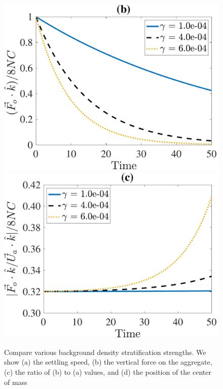 \begin{figure}[ht]
\begin{center}
		\includegraphics[scale=0.35]{./figures/fig_NC50_g_Fo3_all}
		\includegraphics[scale=0.35]{./figures/fig_NC50_g_Fo3Ua_ratio}
	\caption{Compare various background density stratification strengths. We show (a) the settling speed, (b) the vertical force on the aggregate, (c) the ratio of (b) to (a) values, and (d) the position of the center of mass }
	\label{fig_NC50_gg}
\end{center}
\end{figure}
\clearpage
